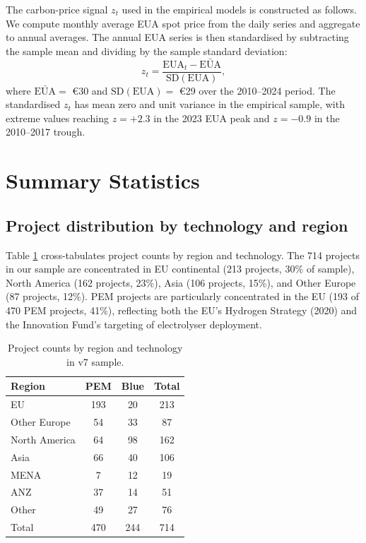 The carbon-price signal $z_t$ used in the empirical models is constructed as follows. We compute monthly average EUA spot price from the daily series and aggregate to annual averages. The annual EUA series is then standardised by subtracting the sample mean and dividing by the sample standard deviation:
\begin{equation}
z_t = \frac{\mathrm{EUA}_t - \bar{\mathrm{EUA}}}{\mathrm{SD}(\mathrm{EUA})},
\end{equation}
where $\bar{\mathrm{EUA}} = $ \euro 30 and $\mathrm{SD}(\mathrm{EUA}) = $ \euro 29 over the 2010--2024 period. The standardised $z_t$ has mean zero and unit variance in the empirical sample, with extreme values reaching $z = +2.3$ in the 2023 EUA peak and $z = -0.9$ in the 2010--2017 trough.

\section{Summary Statistics}
\label{sec:ch4-summary}

\subsection{Project distribution by technology and region}

Table \ref{tab:ch4-region-tech} cross-tabulates project counts by region and technology. The 714 projects in our sample are concentrated in EU continental (213 projects, 30\% of sample), North America (162 projects, 23\%), Asia (106 projects, 15\%), and Other Europe (87 projects, 12\%). PEM projects are particularly concentrated in the EU (193 of 470 PEM projects, 41\%), reflecting both the EU's Hydrogen Strategy (2020) and the Innovation Fund's targeting of electrolyser deployment.

\begin{table}[h!]
\centering
\caption{Project counts by region and technology in v7 sample.}
\begin{tabular}{lccc}
\toprule
Region & PEM & Blue & Total \\
\midrule
EU                  & 193 &  20 & 213 \\
Other Europe        &  54 &  33 &  87 \\
North America       &  64 &  98 & 162 \\
Asia                &  66 &  40 & 106 \\
MENA                &   7 &  12 &  19 \\
ANZ                 &  37 &  14 &  51 \\
Other               &  49 &  27 &  76 \\
\midrule
Total               & 470 & 244 & 714 \\
\bottomrule
\end{tabular}
\label{tab:ch4-region-tech}
\end{table}

